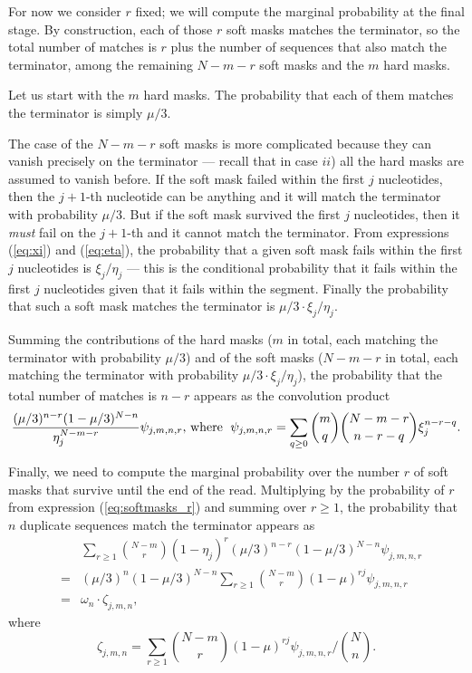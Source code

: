 \documentclass{article}
\begin{document}
For now we consider $r$ fixed; we will compute the marginal probability at
the final stage. By construction, each of those $r$ soft masks matches the
terminator, so the total number of matches is $r$ plus the number of
sequences that also match the terminator, among the remaining $N-m-r$ soft
masks and the $m$ hard masks.

Let us start with the $m$ hard masks. The probability that each of them
matches the terminator is simply $\mu/3$.

The case of the $N-m-r$ soft masks is more complicated because they can
vanish precisely on the terminator --- recall that in case $ii$) all the
hard masks are assumed to vanish before. If the soft mask failed within
the first $j$ nucleotides, then the $j+1$-th nucleotide can be anything
and it will match the terminator with probability $\mu/3$. But if the soft
mask survived the first $j$ nucleotides, then it \emph{must} fail on the
$j+1$-th and it cannot match the terminator. From expressions
(\ref{eq:xi}) and (\ref{eq:eta}), the probability that a given soft mask
fails within the first $j$ nucleotides is $\xi_j/\eta_j$ --- this is the
conditional probability that it fails within the first $j$ nucleotides
given that it fails within the segment. Finally the probability that such
a soft mask matches the terminator is $\mu/3 \cdot \xi_j / \eta_j$.

Summing the contributions of the hard masks ($m$ in total, each matching
the terminator with probability $\mu/3$) and of the soft masks ($N-m-r$ in
total, each matching the terminator with probability
$\mu/3\cdot\xi_j/\eta_j$), the probability that the total number of
matches is $n-r$ appears as the convolution product
\begin{equation*}
\frac{(\mu/3)^{n-r}(1-\mu/3)^{N-n}}{\eta_j^{N-m-r}}
\psi_{j,m,n,r}\text{, where \;}
\psi_{j,m,n,r} = \sum_{q \geq 0}{m \choose q}{N-m-r \choose n-r-q}
\xi_j^{n-r-q}.
\end{equation*}

Finally, we need to compute the marginal probability over the number $r$
of soft masks that survive until the end of the read. Multiplying by the
probability of $r$ from expression (\ref{eq:softmasks_r}) and summing over
$r \geq 1$, the probability that $n$ duplicate sequences match the
terminator appears as
\begin{eqnarray*}
&\;& \sum_{r\geq1} {N-m \choose r}
(1 - \eta_j)^r (\mu/3)^{n-r} (1-\mu/3)^{N-n} \psi_{j,m,n,r} \\
&=& (\mu/3)^n(1-\mu/3)^{N-n} \sum_{r\geq1} {N-m \choose r}
  (1 - \mu)^{rj} \psi_{j,m,n,r} \\
&=& \omega_n \cdot \zeta_{j,m,n},
\end{eqnarray*}
where
\begin{equation}
\label{eq:zeta}
\zeta_{j,m,n} = \sum_{r\geq1} {N-m \choose r}
(1-\mu)^{rj} \psi_{j,m,n,r} \bigg/ {N \choose n}.
\end{equation}
\end{document}
